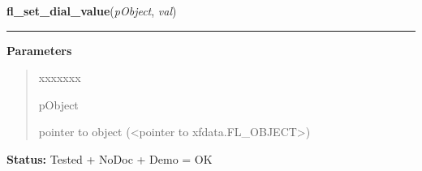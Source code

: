     \label{xformslib:library:fl_set_dial_value}

    \vspace{0.5ex}

\hspace{.8\funcindent}\begin{boxedminipage}{\funcwidth}

    \raggedright \textbf{fl\_set\_dial\_value}(\textit{pObject}, \textit{val})

    \vspace{-1.5ex}

    \rule{\textwidth}{0.5\fboxrule}
\setlength{\parskip}{2ex}
\setlength{\parskip}{1ex}
      \textbf{Parameters}
      \vspace{-1ex}

      \begin{quote}
        \begin{Ventry}{xxxxxxx}

          \item[pObject]

          pointer to object ({\textless}pointer to 
          xfdata.FL\_OBJECT{\textgreater})

        \end{Ventry}

      \end{quote}

\textbf{Status:} Tested + NoDoc + Demo = OK



    \end{boxedminipage}

    \label{xformslib:library:fl_get_dial_value}

    \vspace{0.5ex}

